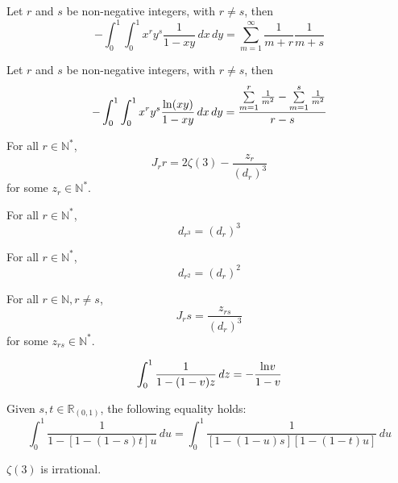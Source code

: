 \begin{lemma}\label{I_rs}
    Let $r$ and $s$ be non-negative integers, with $r \neq s$, then
    \[ -\int_{0}^{1}\int_{0}^{1} x^ry^s\frac{1}{1-xy} \, dx \, dy = \sum\limits_{m = 1}^{\infty}\frac{1}{m+r}\frac{1}{m+s} \]
\end{lemma}

\begin{lemma}\label{J_rs}
    Let $r$ and $s$ be non-negative integers, with $r \neq s$, then
    \[ -\int_{0}^{1}\int_{0}^{1} x^ry^s\frac{{\rm ln}(xy)}{1-xy} \, dx \, dy = \frac{\sum\limits_{m = 1}^{r}\frac{1}{m^2} - \sum\limits_{m = 1}^{s}\frac{1}{m^2}}{r - s} \]
\end{lemma}

\begin{lemma}\label{Jrr_linear_form}
    For all $r \in \mathbb{N}^*$,
    \[ J_rr = 2 \zeta(3) - \frac{z_r}{(d_r)^3} \]
    for some $z_r \in \mathbb{N}^*$.
\end{lemma}

\begin{lemma}\label{d_r_3}
    For all $r \in \mathbb{N}^*$,
    \[ d_{r^3} = (d_r)^3 \]
\end{lemma}

\begin{lemma}\label{d_r_2}
    For all $r \in \mathbb{N}^*$,
    \[ d_{r^2} = (d_r)^2 \]
\end{lemma}

\begin{lemma}\label{Jrs_postive_rational}
    For all $r \in \mathbb{N}, r \neq s$,
    \[ J_rs = \frac{z_{rs}}{(d_r)^3}\]
    for some $z_{rs} \in \mathbb{N}^*$.
\end{lemma}

\begin{lemma}\label{one_var_substitution}
    \[ \int_{0}^{1} \frac{1}{1 - (1 - v)z} \, dz= -\frac{{\rm ln}v}{1 - v} \]
\end{lemma}

\begin{lemma}\label{two_var_substitution}
    Given $s, t \in \mathbb{R}_{(0,1)}$, the following equality holds:
    \[ \int_{0}^{1} \frac{1}{1 - [1 - (1 - s)t]u} \, du = \int_{0}^{1} \frac{1}{[1 - (1 - u)s][1 - (1 - t)u]} \, du \]
\end{lemma}

\begin{theorem}\label{zeta_3_irrational}
    $\zeta(3)$ is irrational.
\end{theorem}
